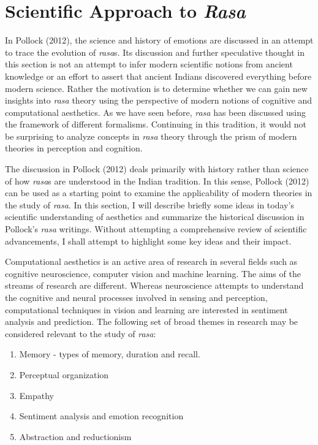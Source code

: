 \section*{Scientific Approach to \textsl{Rasa}}

In Pollock (2012), the science and history of emotions are discussed in an attempt to trace the evolution of \textsl{rasa}s. Its discussion and further speculative thought in this section is not an attempt to infer modern scientific notions from ancient knowledge or an effort to assert that ancient Indians discovered everything before modern science. Rather the motivation is to determine whether we can gain new insights into \textsl{rasa} theory using the perspective of modern notions of cognitive and computational aesthetics. As we have seen before, \textsl{rasa} has been discussed using the framework of different formalisms. Continuing in this tradition, it would not be surprising to analyze concepts in \textsl{rasa} theory through the prism of modern theories in perception and cognition. 

The discussion in Pollock (2012) deals primarily with history rather than science of how \textsl{rasa}s are understood in the Indian tradition. In this sense, Pollock (2012) can be used as a starting point to examine the applicability of modern theories in the study of \textsl{rasa}. In this section, I will describe briefly some ideas in today’s scientific understanding of aesthetics and summarize the historical discussion in Pollock’s \textsl{rasa} writings. Without attempting a comprehensive review of scientific advancements, I shall attempt to highlight some key ideas and their impact. 

Computational aesthetics is an active area of research in several fields such as cognitive neuroscience, computer vision and machine learning. The aims of the streams of research are different. Whereas neuroscience attempts to understand the cognitive and neural processes involved in sensing and perception, computational techniques in vision and learning are interested in sentiment analysis and prediction. The following set of broad themes in research may be considered relevant to the study of \textsl{rasa}:
\begin{enumerate}
\itemsep=1pt
\item Memory - types of memory, duration and recall. 
\item Perceptual organization
\item Empathy
\item Sentiment analysis and emotion recognition
\item Abstraction and reductionism
\end{enumerate}


